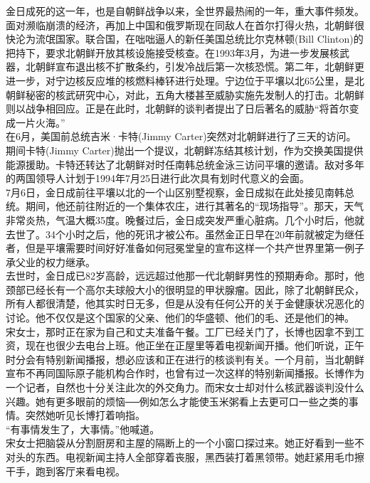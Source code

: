 \begin{multicols}{\theparacolNo}
金日成死的这一年，也是自朝鲜战争以来，全世界最热闹的一年，重大事件频发。面对濒临崩溃的经济，再加上中国和俄罗斯现在同敌人在首尔打得火热，北朝鲜很快沦为流氓国家。联合国，在咄咄逼人的新任美国总统比尔克林顿(Bill Clinton)的把持下，要求北朝鲜开放其核设施接受核查。在1993年3月，为进一步发展核武器，北朝鲜宣布退出核不扩散条约，引发冷战后第一次核恐慌。第二年，北朝鲜更进一步，对宁边核反应堆的核燃料棒钚进行处理。宁边位于平壤以北65公里，是北朝鲜秘密的核武研究中心，对此，五角大楼甚至威胁实施先发制人的打击。北朝鲜则以战争相回应。正是在此时，北朝鲜的谈判者提出了日后著名的威胁“将首尔变成一片火海。”\\

在6月，美国前总统吉米·卡特(Jimmy Carter)突然对北朝鲜进行了三天的访问。期间卡特(Jimmy Carter)抛出一个提议，北朝鲜冻结其核计划，作为交换美国提供能源援助。卡特还转达了北朝鲜对时任南韩总统金泳三访问平壤的邀请。敌对多年的两国领导人计划于1994年7月25日进行此次具有划时代意义的会面。\\

7月6日，金日成前往平壤以北的一个山区别墅视察，金日成拟在此处接见南韩总统。期间，他还前往附近的一个集体农庄，进行其著名的“现场指导”。那天，天气非常炎热，气温大概35度。晚餐过后，金日成突发严重心脏病。几个小时后，他就去世了。34个小时之后，他的死讯才被公布。虽然金正日早在20年前就被定为继任者，但是平壤需要时间好好准备如何冠冕堂皇的宣布这样一个共产世界里第一例子承父业的权力继承。\\

去世时，金日成已82岁高龄，远远超过他那一代北朝鲜男性的预期寿命。那时，他颈部已经长有一个高尔夫球般大小的很明显的甲状腺瘤。因此，除了北朝鲜民众，所有人都很清楚，他其实时日无多，但是从没有任何公开的关于金健康状况恶化的讨论。他不仅仅是这个国家的父亲、他们的华盛顿、他们的毛、还是他们的神。\\

宋女士，那时正在家为自己和丈夫准备午餐。工厂已经关门了，长博也因拿不到工资，现在也很少去电台上班。他正坐在正屋里等着电视新闻开播。他们听说，正午时分会有特别新闻播报，想必应该和正在进行的核谈判有关。一个月前，当北朝鲜宣布不再同国际原子能机构合作时，也曾有过一次这样的特别新闻播报。长博作为一个记者，自然也十分关注此次的外交角力。而宋女士却对什么核武器谈判没什么兴趣。她有更多眼前的烦恼──例如怎么才能使玉米粥看上去更可口一些之类的事情。突然她听见长博打着响指。\\

“有事情发生了，大事情。”他喊道。\\

宋女士把脑袋从分割厨房和主屋的隔断上的一个小窗口探过来。她正好看到一些不对头的东西。电视新闻主持人全部穿着丧服，黑西装打着黑领带。她赶紧用毛巾擦干手，跑到客厅来看电视。\\


\end{multicols}
